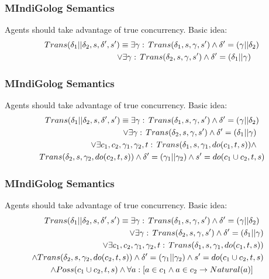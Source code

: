 \documentclass{beamer}
\begin{document}
\begin{frame}
\frametitle{MIndiGolog Semantics}
Agents should take advantage of true concurrency. Basic idea:
\begin{multline*}
Trans(\delta_{1}||\delta_{2},s,\delta',s')\equiv\exists\gamma:\, Trans(\delta_{1},s,\gamma,s')\wedge\delta'=(\gamma||\delta_{2})\\
\shoveright{\vee\exists\gamma:\, Trans(\delta_{2},s,\gamma,s')\wedge\delta'=(\delta_{1}||\gamma)}\\
\end{multline*}
\end{frame}

\begin{frame}
\frametitle{MIndiGolog Semantics}
Agents should take advantage of true concurrency. Basic idea:
\begin{multline*}
Trans(\delta_{1}||\delta_{2},s,\delta',s')\equiv\exists\gamma:\, Trans(\delta_{1},s,\gamma,s')\wedge\delta'=(\gamma||\delta_{2})\\
\shoveright{\vee\exists\gamma:\, Trans(\delta_{2},s,\gamma,s')\wedge\delta'=(\delta_{1}||\gamma)}\\
\shoveright{\vee\exists c_{1},c_{2},\gamma_{1},\gamma_{2},t:\, Trans(\delta_{1},s,\gamma_{1},do(c_{1},t,s))\wedge}\\ 
Trans(\delta_{2},s,\gamma_{2},do(c_{2},t,s))\wedge\delta'=(\gamma_{1}||\gamma_{2})\wedge s'=do(c_{1}\cup c_{2},t,s)
\end{multline*}
\end{frame}

\begin{frame}
\frametitle{MIndiGolog Semantics}
Agents should take advantage of true concurrency. Basic idea:
\begin{multline*}
Trans(\delta_{1}||\delta_{2},s,\delta',s')\equiv\exists\gamma:\, Trans(\delta_{1},s,\gamma,s')\wedge\delta'=(\gamma||\delta_{2})\\
\shoveright{\vee\exists\gamma:\, Trans(\delta_{2},s,\gamma,s')\wedge\delta'=(\delta_{1}||\gamma)}\\
\shoveright{\vee\exists c_{1},c_{2},\gamma_{1},\gamma_{2},t:\, Trans(\delta_{1},s,\gamma_{1},do(c_{1},t,s))}\\
\shoveright{\wedge Trans(\delta_{2},s,\gamma_{2},do(c_{2},t,s))\wedge\delta'=(\gamma_1||\gamma_2)\wedge s'=do(c_1\cup c_2,t,s)}\\
\wedge Poss(c_1\cup c_2,t,s)\wedge\forall a:\left[a\in c_{1}\wedge a\in c_{2}\rightarrow Natural(a)\right]
\end{multline*}
\end{frame}
\end{document}
